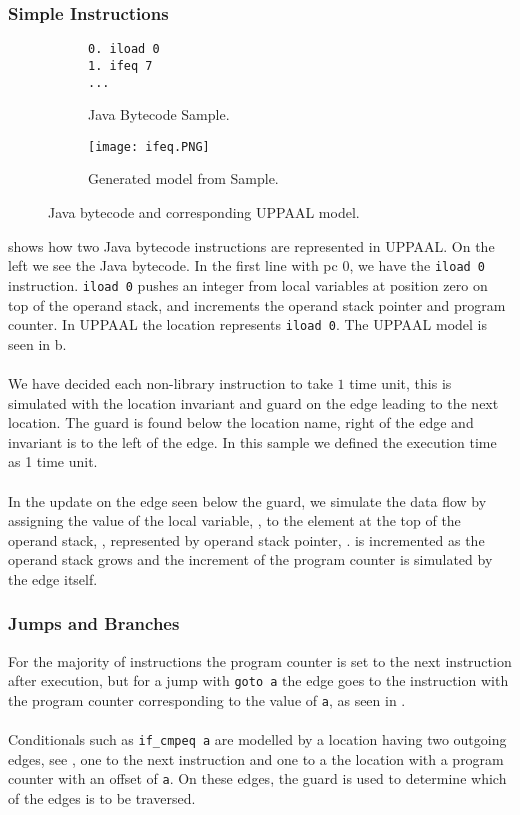 \subsubsection{Simple Instructions}
\begin{figure}[H]
\centering
\begin{subfigure}{.3\textwidth}
  \begin{lstlisting}
0. iload 0
1. ifeq 7
...
  \end{lstlisting}
  \caption{Java Bytecode Sample.}
\end{subfigure} 
\hspace{10px}
\begin{subfigure}{.6\textwidth}
  \texttt{[image: ifeq.PNG]}
  \caption{Generated model from Sample.}
\end{subfigure}
\caption{Java bytecode and corresponding UPPAAL model.}
\label{fig:uppaal1}
\end{figure}

 shows how two Java bytecode instructions are represented in UPPAAL. On the left we see the Java bytecode. In the first line with pc 0, we have the \texttt{iload 0} instruction. \texttt{iload 0} pushes an integer from local variables at position zero on top of the operand stack, and increments the operand stack pointer and program counter.
In UPPAAL the location  represents \texttt{iload 0}. The UPPAAL model is seen in b.\\\\
We have decided each non-library instruction to take $1$ time unit, this is simulated with the location invariant  and guard  on the edge leading to the next location. The guard is found below the location name, right of the edge and invariant is to the left of the edge. In this sample we defined the execution time as 1 time unit.\\\\
In the update on the edge seen below the guard, we simulate the data flow by assigning the value of the local variable, , to the element at the top of the operand stack, , represented by operand stack pointer, .  is incremented as the operand stack grows and the increment of the program counter is simulated by the edge itself.

\subsubsection{Jumps and Branches}
For the majority of instructions the program counter is set to the next instruction after execution, but for a jump with \texttt{goto a} the edge goes to the instruction with the program counter corresponding to the value of \texttt{a}, as seen in .\\\\
Conditionals such as \texttt{if\_cmpeq a} are modelled by a location having two outgoing edges, see , one to the next instruction and one to a the location with a program counter with an offset of \texttt{a}. On these edges, the guard is used to determine which of the edges is to be traversed.

